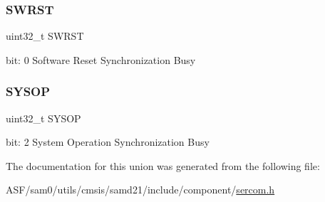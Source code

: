 \subsubsection{\texorpdfstring{SWRST}{SWRST}}
{\footnotesize\ttfamily uint32\+\_\+t S\+W\+R\+ST}

bit\+: 0 Software Reset Synchronization Busy \mbox{\label{union_s_e_r_c_o_m___i2_c_m___s_y_n_c_b_u_s_y___type_a8fa543cb284ecc42c48daa582579f57e}} 
\subsubsection{\texorpdfstring{SYSOP}{SYSOP}}
{\footnotesize\ttfamily uint32\+\_\+t S\+Y\+S\+OP}

bit\+: 2 System Operation Synchronization Busy 

The documentation for this union was generated from the following file\+:\begin{DoxyCompactItemize}
\item 
A\+S\+F/sam0/utils/cmsis/samd21/include/component/\mbox{\hyperlink{utils_2cmsis_2samd21_2include_2component_2sercom_8h}{sercom.\+h}}\end{DoxyCompactItemize}
